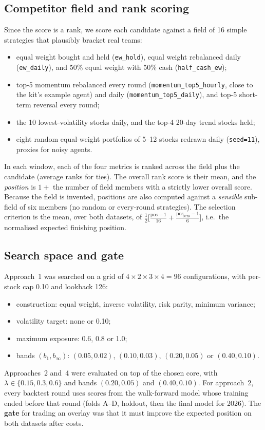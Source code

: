 \documentclass[11pt,a4paper]{article}
\newcommand{\code}[1]{\texttt{#1}}
\begin{document}
\subsection{Competitor field and rank scoring}
Since the score is a rank, we score each candidate against a field of 16 simple strategies that plausibly bracket real
teams:
\begin{itemize}[nosep]
  \item equal weight bought and held (\code{ew\_hold}), equal weight rebalanced daily (\code{ew\_daily}), and 50\% equal
        weight with 50\% cash (\code{half\_cash\_ew});
  \item top-5 momentum rebalanced every round (\code{momentum\_top5\_hourly}, close to the kit's example agent) and daily
        (\code{momentum\_top5\_daily}), and top-5 short-term reversal every round;
  \item the 10 lowest-volatility stocks daily, and the top-4 20-day trend stocks held;
  \item eight random equal-weight portfolios of 5--12 stocks redrawn daily (\code{seed=11}), proxies for noisy agents.
\end{itemize}
In each window, each of the four metrics is ranked across the field plus the candidate (average ranks for ties). The
overall rank score is their mean, and the \emph{position} is $1+$ the number of field members with a strictly lower
overall score. Because the field is invented, positions are also computed against a \emph{sensible} sub-field of six
members (no random or every-round strategies). The selection criterion is the mean, over both datasets, of
$\tfrac12\big[\tfrac{\text{pos}-1}{16}+\tfrac{\text{pos}_{\text{sens}}-1}{6}\big]$, i.e.\ the normalised expected finishing
position.

\subsection{Search space and gate}
Approach~1 was searched on a grid of $4\times2\times3\times4=96$ configurations, with per-stock cap 0.10 and lookback 126:
\begin{itemize}[nosep]
  \item construction: equal weight, inverse volatility, risk parity, minimum variance;
  \item volatility target: none or 0.10;
  \item maximum exposure: 0.6, 0.8 or 1.0;
  \item bands $(b_1,b_\infty)$: $(0.05,0.02)$, $(0.10,0.03)$, $(0.20,0.05)$ or $(0.40,0.10)$.
\end{itemize} Approaches~2 and~4 were evaluated on top of the chosen core, with
$\lambda\in\{0.15,0.3,0.6\}$ and bands $(0.20,0.05)$ and $(0.40,0.10)$. For approach~2, every backtest round uses scores from
the walk-forward model whose training ended before that round (folds A--D, holdout, then the final model for 2026).
The \textbf{gate} for trading an overlay was that it must improve the expected position on both datasets after costs.
\end{document}
